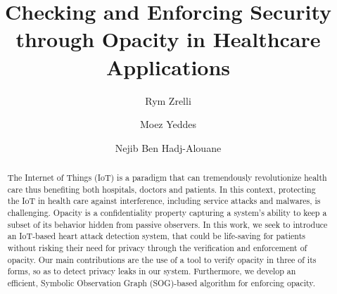 \documentclass{llncs}
\begin{document}
%
\title{Checking and Enforcing Security through Opacity in Healthcare Applications}


\author{Rym Zrelli 
 \and Moez Yeddes \and Nejib Ben Hadj-Alouane }
%
%
%

\maketitle


\begin{abstract}
The Internet of Things (IoT) is a paradigm that can tremendously revolutionize health care thus benefiting both hospitals, doctors and patients. In this context, protecting the IoT in health care against interference, including service attacks and malwares, is challenging. Opacity is a confidentiality property capturing a system's ability to keep a subset of its behavior hidden from passive observers. In this work, we seek to introduce an IoT-based heart attack detection system, that could be life-saving for patients without risking their need for privacy through the verification and enforcement of opacity. Our main contributions are the use of a tool to verify opacity in three of its forms, so as to detect privacy leaks in our system. Furthermore, we develop an efficient, Symbolic Observation Graph (SOG)-based algorithm for enforcing opacity.
\end{abstract}


















\clearpage
%
%
%
\end{document}
